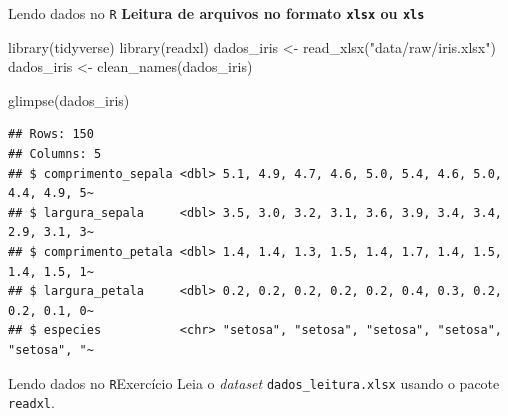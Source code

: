 \documentclass[
  10pt,
  ignorenonframetext,
]{beamer}
\newenvironment{Shaded}{}{}
\newcommand{\KeywordTok}[1]{\textcolor[rgb]{0.00,0.00,1.00}{#1}}
\newcommand{\NormalTok}[1]{#1}
\newcommand{\StringTok}[1]{\textcolor[rgb]{0.00,0.50,0.50}{#1}}
\begin{document}
\begin{frame}[fragile]{Lendo dados no \texttt{R}}
\protect\hypertarget{lendo-dados-no-r-1}{}
\textbf{Leitura de arquivos no formato \texttt{xlsx} ou \texttt{xls}}

\small

\begin{Shaded}
\begin{Highlighting}[]
\KeywordTok{library}\NormalTok{(tidyverse)}
\KeywordTok{library}\NormalTok{(readxl)}
\NormalTok{dados\_iris \textless{}{-}}\StringTok{ }\KeywordTok{read\_xlsx}\NormalTok{(}\StringTok{"data/raw/iris.xlsx"}\NormalTok{)}
\NormalTok{dados\_iris \textless{}{-}}\StringTok{ }\KeywordTok{clean\_names}\NormalTok{(dados\_iris)}

\KeywordTok{glimpse}\NormalTok{(dados\_iris)}
\end{Highlighting}
\end{Shaded}

\begin{verbatim}
## Rows: 150
## Columns: 5
## $ comprimento_sepala <dbl> 5.1, 4.9, 4.7, 4.6, 5.0, 5.4, 4.6, 5.0, 4.4, 4.9, 5~
## $ largura_sepala     <dbl> 3.5, 3.0, 3.2, 3.1, 3.6, 3.9, 3.4, 3.4, 2.9, 3.1, 3~
## $ comprimento_petala <dbl> 1.4, 1.4, 1.3, 1.5, 1.4, 1.7, 1.4, 1.5, 1.4, 1.5, 1~
## $ largura_petala     <dbl> 0.2, 0.2, 0.2, 0.2, 0.2, 0.4, 0.3, 0.2, 0.2, 0.1, 0~
## $ especies           <chr> "setosa", "setosa", "setosa", "setosa", "setosa", "~
\end{verbatim}

\normalsize
\end{frame}

\begin{frame}[fragile]{Lendo dados no \texttt{R}\newline Exercício}
\protect\hypertarget{lendo-dados-no-rexercuxedcio}{}
Leia o \emph{dataset} \texttt{dados\_leitura.xlsx} usando o pacote
\texttt{readxl}.
\end{frame}
\end{document}
